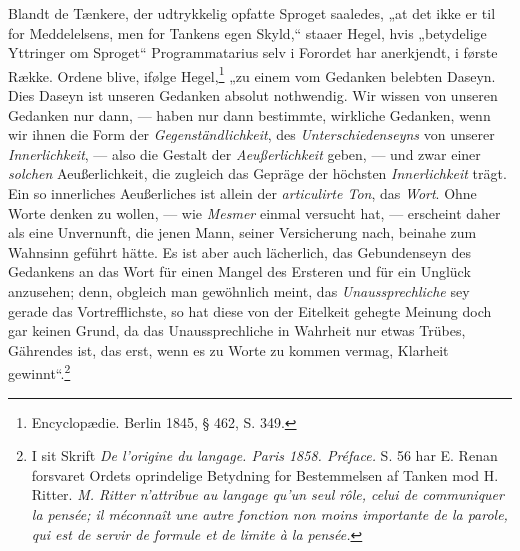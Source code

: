 \documentclass[12pt]{book}
\newcommand{\opage}[1]{\marginnote{\footnotesize\textit{[#1]}}}
\begin{document}
\opage{26}Blandt de Tænkere, der udtrykkelig opfatte Sproget saaledes,
„at det ikke er til for Meddelelsens, men for Tankens egen
Skyld,“ staaer Hegel, hvis „betydelige Yttringer om Sproget“
Programmatarius selv i Forordet har anerkjendt, i første
Række. Ordene blive, ifølge Hegel,\footnote{Encyclopædie. Berlin 1845, § 462, S. 349.}%
„zu einem vom Gedanken
belebten Daseyn. Dies Daseyn ist unseren Gedanken
absolut nothwendig. Wir wissen von unseren Gedanken nur
dann, --- haben nur dann bestimmte, wirkliche Gedanken, wenn
wir ihnen die Form der \emph{Gegenständlichkeit}, des \emph{Unterschiedenseyns}
von unserer \emph{Innerlichkeit}, --- also die
Gestalt der \emph{Aeußerlichkeit} geben, --- und zwar einer \emph{solchen}
Aeußerlichkeit, die zugleich das Gepräge der höchsten \emph{Innerlichkeit}
trägt. Ein so innerliches Aeußerliches ist allein der
\emph{articulirte Ton}, das \emph{Wort}. Ohne Worte denken zu wollen,
--- wie \emph{Mesmer} einmal versucht hat, --- erscheint daher als
eine Unvernunft, die jenen Mann, seiner Versicherung nach,
beinahe zum Wahnsinn geführt hätte. Es ist aber auch lächerlich,
das Gebundenseyn des Gedankens an das Wort für
einen Mangel des Ersteren und für ein Unglück anzusehen;
denn, obgleich man gewöhnlich meint, das \emph{Unaussprechliche}
sey gerade das Vortrefflichste, so hat diese von der Eitelkeit
gehegte Meinung doch gar keinen Grund, da das Unaussprechliche
in Wahrheit nur etwas Trübes, Gährendes ist, das erst,
wenn es zu Worte zu kommen vermag, Klarheit gewinnt“.\footnote{I
sit Skrift \textit{De l'origine du langage. Paris 1858. Préface.} S. 56
har E. Renan forsvaret Ordets oprindelige Betydning for Bestemmelsen
af Tanken mod H. Ritter. \textit{M. Ritter n'attribue au langage qu'un
seul rôle, celui de communiquer la pensée; il méconnaît une
autre fonction non moins importante de la parole, qui est de
servir de formule et de limite à la pensée.}}%
\end{document}

